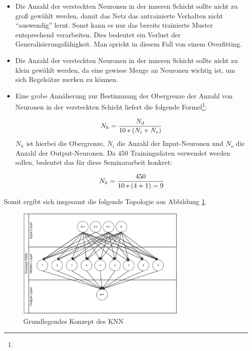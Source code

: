 \begin{itemize}
\item Die Anzahl der versteckten Neuronen in der inneren Schicht sollte nicht zu groß gewählt werden, damit das Netz das antrainierte Verhalten nicht "`auswendig"' lernt. Sonst kann es nur das bereits trainierte Muster entsprechend verarbeiten. Dies bedeutet ein Verlust der Generalisierungsfähigkeit. Man spricht in diesem Fall von einem Overfitting.

\item Die Anzahl der versteckten Neuronen in der inneren Schicht sollte nicht zu klein gewählt werden, da eine gewisse Menge an Neuronen wichtig ist, um sich Regelsätze merken zu können.

\item Eine grobe Annäherung zur Bestimmung der Obergrenze der Anzahl von Neuronen in der versteckten Schicht liefert die folgende Formel\footnote{\Vgl{}}:

\begin{equation}\formelentry{Optimale Anzahl Neuronen in der versteckten Schicht}
  N_h = \frac{N_d}{10*(N_i+N_o)}
\end{equation}
$N_h$ ist hierbei die Obergrenze, $N_i$ die Anzahl der Input-Neuronen und $N_o$ die Anzahl der Output-Neuronen. Da $450$ Trainingsdaten verwendet werden sollen, bedeutet das für diese Seminararbeit konkret:

\begin{equation}\formelentry{Optimale Anzahl Neuronen in der versteckten Schicht}
  N_h = \frac{450}{10*(4+1) = 9 }   
\end{equation}
\end{itemize}
 
Somit ergibt sich insgesamt die folgende Topologie aus Abbildung \ref{fig:Grundlegende Topologie des KNN}. 

\begin{figure}[H]
\centering
		\includegraphics[width=0.75\textwidth]{Bilder/Konzeption/KonzKNN.PNG}
	\caption{Grundlegendes Konzept des KNN}
	\label{fig:Grundlegende Topologie des KNN}
\end{figure}


